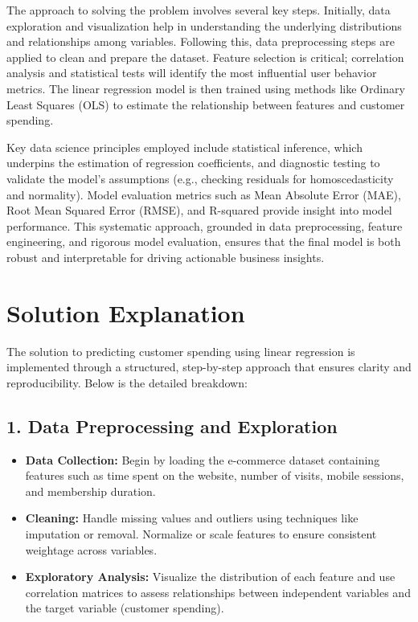 \documentclass[12pt]{article}
\begin{document}
The approach to solving the problem involves several key steps. Initially, data exploration and visualization help in understanding the underlying distributions and relationships among variables. Following this, data preprocessing steps are applied to clean and prepare the dataset. Feature selection is critical; correlation analysis and statistical tests will identify the most influential user behavior metrics. The linear regression model is then trained using methods like Ordinary Least Squares (OLS) to estimate the relationship between features and customer spending.


Key data science principles employed include statistical inference, which underpins the estimation of regression coefficients, and diagnostic testing to validate the model’s assumptions (e.g., checking residuals for homoscedasticity and normality). Model evaluation metrics such as Mean Absolute Error (MAE), Root Mean Squared Error (RMSE), and R-squared provide insight into model performance. This systematic approach, grounded in data preprocessing, feature engineering, and rigorous model evaluation, ensures that the final model is both robust and interpretable for driving actionable business insights.


\section{Solution Explanation}
The solution to predicting customer spending using linear regression is implemented through a structured, step-by-step approach that ensures clarity and reproducibility. Below is the detailed breakdown:

\subsection*{1. Data Preprocessing and Exploration}
\begin{itemize}[leftmargin=*, label=\textbullet]
    \item \textbf{Data Collection:} Begin by loading the e-commerce dataset containing features such as time spent on the website, number of visits, mobile sessions, and membership duration.
    \item \textbf{Cleaning:} Handle missing values and outliers using techniques like imputation or removal. Normalize or scale features to ensure consistent weightage across variables.
    \item \textbf{Exploratory Analysis:} Visualize the distribution of each feature and use correlation matrices to assess relationships between independent variables and the target variable (customer spending).



    
\end{itemize}
\end{document}
